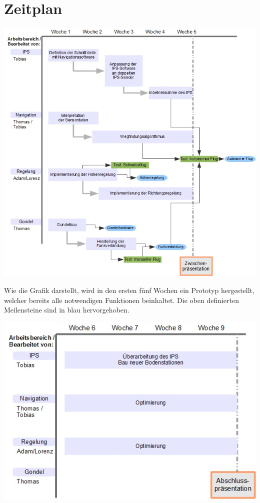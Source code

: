 \documentclass[lang=ngerman,inputenc=utf8,fontsize=10pt]{ldvarticle}
\begin{document}
\section{Zeitplan}

\includegraphics[scale=0.5]{Zeitplan-Arbeitspakete}


Wie die Grafik darstellt, wird in den ersten fünf Wochen ein Prototyp hergestellt, welcher bereits alle notwendigen Funktionen beinhaltet. Die oben definierten Meilensteine sind in blau hervorgehoben.


\includegraphics[scale=0.5]{Zeitplan-Arbeitspakete2}
\end{document}
